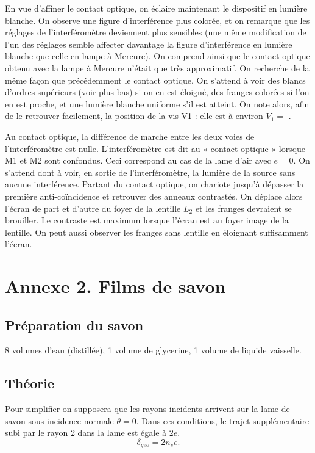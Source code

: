 \documentclass[french]{article}
\begin{document}
En vue d’affiner le contact optique, on éclaire maintenant le dispositif en lumière blanche. On observe une figure d’interférence plus colorée, et on remarque que les réglages de l’interféromètre deviennent plus sensibles (une même modification de l’un des réglages semble affecter davantage la
figure d’interférence en lumière blanche que celle en lampe à Mercure). On comprend ainsi que le contact optique obtenu avec la lampe à Mercure n’était que très approximatif. On recherche de la même façon que précédemment le contact optique. On s’attend à voir des blancs d’ordres supérieurs (voir plus bas) si on en est éloigné, des franges colorées si l’on en est proche, et une lumière blanche uniforme s’il est atteint. On note alors, afin de le retrouver facilement, la position de la vis V1 : elle est à environ $V_1  = $ .\vspace{.5cm}


Au contact optique, la différence de marche entre les deux voies de l’interféromètre est nulle. L’interféromètre est dit au « contact optique » lorsque M1 et M2 sont confondus. Ceci correspond au cas de la lame d’air avec $e = 0$. On s’attend dont à voir, en sortie de l’interféromètre, la lumière de la source sans aucune interférence. Partant du contact optique, on chariote  jusqu'à dépasser la première anti-coïncidence et retrouver des anneaux contrastés. On déplace alors l'écran de part et d'autre du foyer de la lentille $L_2$ et les franges devraient se brouiller. Le contraste est maximum lorsque l'écran est au foyer image de la lentille. On peut aussi observer les franges sans lentille en éloignant suffisamment l'écran.


\section{Annexe 2. Films de savon}

\subsection{Préparation du savon}

8 volumes d'eau (distillée), 1 volume de glycerine, 1 volume de liquide vaisselle.

\subsection{Théorie}
Pour simplifier on supposera que les rayons incidents arrivent sur la lame de savon sous incidence normale $\theta = 0$. Dans ces conditions, le trajet supplémentaire subi par le rayon 2 dans la lame est égale à $2e$. \begin{equation}
	\delta_{geo} = 2n_{s}e.
\end{equation}
\end{document}
